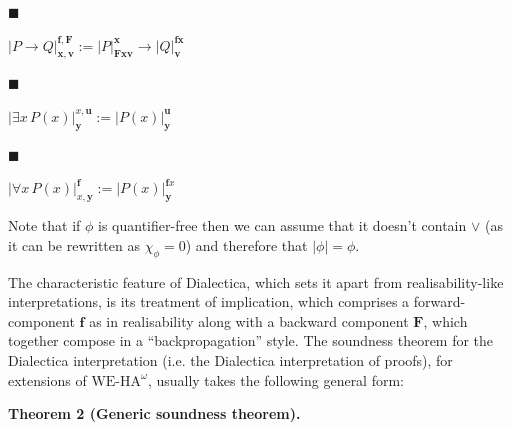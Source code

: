  
 
\par\noindent  $\blacksquare$ 
 
$|{P\to Q}|^{\bm{f},\bm{F}}_{\bm{x},\bm{v}}:=|{P}|^{\bm{x}}_{\bm{F}\bm{x}\bm{v}}\to|{Q}|^{\bm{f}\bm{x}}_{\bm{v}}$\par
 
 
 
\par\noindent  $\blacksquare$ 
 
$|{\exists x\,P(x)}|^{x,\bm{u}}_{\bm{y}}:=|{P(x)}|^{\bm{u}}_{\bm{y}}$\par
 
 
 
\par\noindent  $\blacksquare$ 
 
$|{\forall x\,P(x)}|^{\bm{f}}_{x,\bm{y}}:=|{P(x)}|^{\bm{f}x}_{\bm{y}}$\par
 
 
  
 
 
Note that if $\phi$ is quantifier-free then we can assume that it doesn’t contain $\vee$ (as it can be rewritten as $\chi_{\phi}=0$) and therefore that $|{\phi}|=\phi$.\par
 
 
 
 
The characteristic feature of Dialectica, which sets it apart from realisability-like interpretations, is its treatment of implication, which comprises a forward-component $\bm{f}$ as in realisability along with a backward component $\bm{F}$, which together compose in a “backpropagation” style. The soundness theorem for the Dialectica interpretation (i.e. the Dialectica interpretation of proofs), for extensions of $\mathrm{WE}\mbox{-}\mathrm{HA}^{\omega}$, usually takes the following general form:\par
 
 
 
\par\medskip\noindent\textbf{Theorem 2 (Generic soundness theorem).}\par
 
